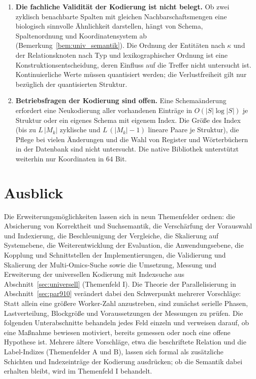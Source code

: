 \documentclass[a4paper,12pt, twoside]{report}
\theoremstyle{definition}
\begin{document}
\begin{enumerate}
	\item \textbf{Die fachliche Validität der Kodierung ist nicht belegt.} Ob zwei zyklisch benachbarte Spalten mit gleichen Nachbarschaftsmengen eine biologisch sinnvolle Ähnlichkeit darstellen, hängt von Schema, Spaltenordnung und Koordinatensystem ab (Bemerkung~\ref{bem:univ_semantik}). Die Ordnung der Entitäten nach $\kappa$ und der Relationsknoten nach Typ und lexikographischer Ordnung ist eine Konstruktionsentscheidung, deren Einfluss auf die Treffer nicht untersucht ist. Kontinuierliche Werte müssen quantisiert werden; die Verlustfreiheit gilt nur bezüglich der quantisierten Struktur.
	\item \textbf{Betriebsfragen der Kodierung sind offen.} Eine Schemaänderung erfordert eine Neukodierung aller vorhandenen Einträge in $O(|S|\log|S|)$ je Struktur oder ein eigenes Schema mit eigenem Index. Die Größe des Index (bis zu $L\,|M_k|$ zyklische und $L\,(|M_k|-1)$ lineare Paare je Struktur), die Pflege bei vielen Änderungen und die Wahl von Register und Wörterbüchern in der Datenbank sind nicht untersucht. Die native Bibliothek unterstützt weiterhin nur Koordinaten in $64$ Bit.
\end{enumerate}

\section{Ausblick}
\label{sec:ausblick}

Die Erweiterungsmöglichkeiten lassen sich in neun Themenfelder ordnen: die Absicherung von Korrektheit und Suchsemantik, die Verschärfung der Vorauswahl und Indexierung, die Beschleunigung der Vergleiche, die Skalierung auf Systemebene, die Weiterentwicklung der Evaluation, die Anwendungsebene, die Kopplung und Schnittstellen der Implementierungen, die Validierung und Skalierung der Multi-Omics-Suche sowie die Umsetzung, Messung und Erweiterung der universellen Kodierung mit Indexsuche aus Abschnitt~\ref{sec:universell} (Themenfeld I). Die Theorie der Parallelisierung in Abschnitt~\ref{sec:par910} verändert dabei den Schwerpunkt mehrerer Vorschläge: Statt allein eine größere Worker-Zahl anzustreben, sind zunächst serielle Phasen, Lastverteilung, Blockgröße und Voraussetzungen der Messungen zu prüfen. Die folgenden Unterabschnitte behandeln jedes Feld einzeln und verweisen darauf, ob eine Maßnahme bewiesen motiviert, bereits gemessen oder noch eine offene Hypothese ist. Mehrere ältere Vorschläge, etwa die beschriftete Relation und die Label-Indizes (Themenfelder A und B), lassen sich formal als zusätzliche Schichten und Indexeinträge der Kodierung ausdrücken; ob die Semantik dabei erhalten bleibt, wird im Themenfeld I behandelt.
\end{document}
